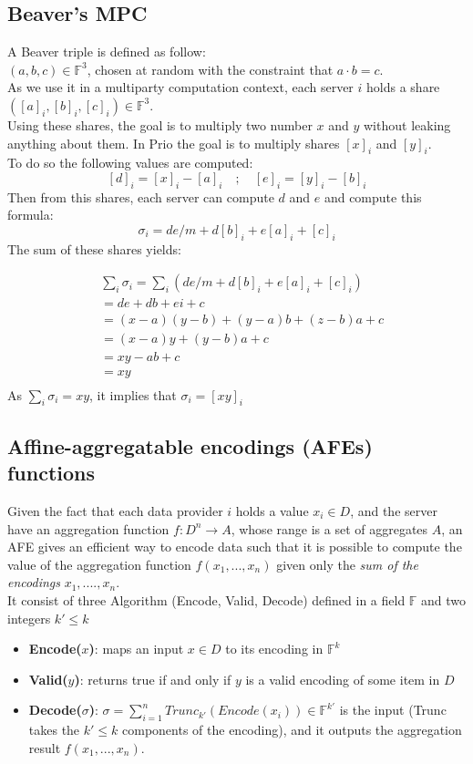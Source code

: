 \documentclass{article}
\begin{document}
\subsection*{Beaver's MPC}
A Beaver triple is defined as follow:\\
$(a,b,c) \in \mathbb{F}^3$, chosen at random with the constraint that $a \cdot b = c$.\\
As we use it in a multiparty computation context, each server $i$ holds a share $([a]_i , [b]_i , [c]_i) \in \mathbb{F}^3$.\\
Using these shares, the goal is to multiply two number $x$ and $y$ without leaking anything about them. In Prio the goal is to multiply shares $[x]_i$ and $[y]_i$.\\
To do so the following values are computed:
$$[d]_i = [x]_i -[a]_i  \quad  ;  \quad  [e]_i = [y]_i - [b]_i$$ 
Then from this shares, each server can compute $d$ and $e$ and compute this formula:\\
$$\sigma_i = de/m + d[b]_i +e[a]_i + [c]_i$$
The sum of these shares yields:

\begin{equation}
\begin{split}
& \sum_{i} \sigma_i = \sum_{i}{(de/m +d[b]_i + e[a]_i + [c]_i)}\\
 & = de +db +ei + c\\
 & = (x-a)(y-b)+ (y-a)b + (z-b)a + c\\
 & = (x-a)y + (y-b)a + c\\
 & = xy -ab + c\\
 & = xy\\
\end{split}
\end{equation}
As $\sum_{i} \sigma_i = xy$, it implies that $\sigma_i = [xy]_i$ 

\subsection*{Affine-aggregatable encodings (AFEs) functions}
Given the fact that each data provider $i$ holds a value $x_i \in D$, and the server have an aggregation function $f : D^n \rightarrow A$, whose range is a set of aggregates $A$, an AFE gives an efficient way to encode data such that it is possible to compute the value of the aggregation function $f(x_1,...,x_n)$ given only the \textit{sum of the encodings} $x_1,....,x_n$.\\
It consist of three Algorithm (Encode, Valid, Decode) defined in a field $\mathbb{F}$ and two integers $k' \leq k$\\
\begin{itemize}
\item \textbf{Encode($x$)}: maps an input $x \in D$ to its encoding in $\mathbb{F}^k$
\item \textbf{Valid($y$)}: returns true if and only if $y$ is a valid encoding of some item in $D$
\item \textbf{Decode($\sigma$)}: $\sigma = \sum_{i=1}^{n}{Trunc_{k'}(Encode(x_i))} \in \mathbb{F}^{k'}$ is the input (Trunc takes the $k' \leq k$ components of the encoding), and it outputs the aggregation result $f(x_1,...,x_n)$.
\end{itemize}
\end{document}
